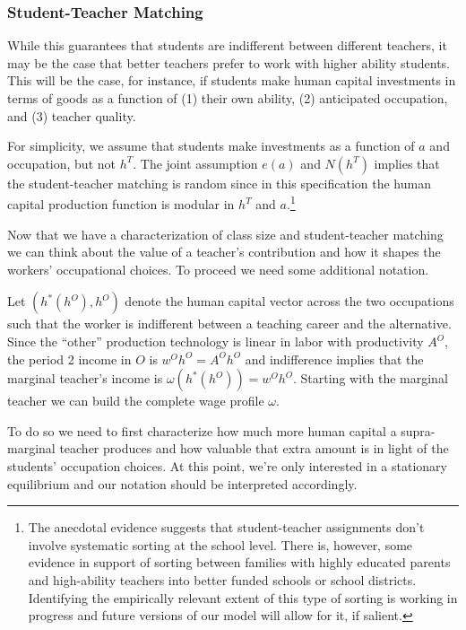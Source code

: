 \documentclass[onehalfspacing,11pt]{article}
\begin{document}
\subsubsection{Student-Teacher Matching}
While this guarantees that students are indifferent between different teachers, it may be the case that better teachers prefer to work with higher ability students. This will be the case, for instance, if students make human capital investments in terms of goods as a function of (1) their own ability, (2) anticipated occupation, and (3) teacher quality. 

For simplicity, we assume that students make investments as a function of $a$ and occupation, but not $h^T$. The joint assumption $e(a)$ and $N(h^T)$ implies that the student-teacher matching is random since in this specification the human capital production function is modular in $h^T$ and $a$.\footnote{The anecdotal evidence suggests that student-teacher assignments don't involve systematic sorting at the school level. There is, however, some evidence in support of sorting between families with highly educated parents and high-ability teachers into better funded schools or school districts. Identifying the empirically relevant extent of this type of sorting is working in progress and future versions of our model will allow for it, if salient.}

Now that we have a characterization of class size and student-teacher matching we can think about the value of a teacher's contribution and how it shapes the workers' occupational choices. To proceed we need some additional notation.

Let $\left(h^*(h^O),h^O\right)$ denote the human capital vector across the two occupations such that the worker is indifferent between a teaching career and the alternative. Since the ``other'' production technology is linear in labor with productivity $A^O$, the period 2 income in $O$ is $w^O h^O = A^O h^O$ and indifference implies that the marginal teacher's income is $\omega\left(h^*(h^O)\right) = w^O h^O$. Starting with the marginal teacher we can build the complete wage profile $\omega$.

To do so we need to first characterize how much more human capital a supra-marginal teacher produces and how valuable that extra amount is in light of the students' occupation choices. At this point, we're only interested in a stationary equilibrium and our notation should be interpreted accordingly.
\end{document}

